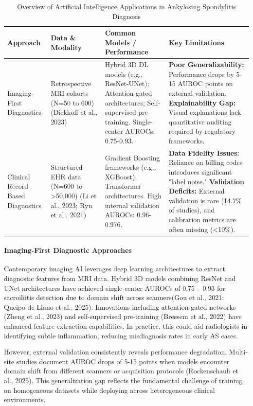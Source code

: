 \documentclass[12pt, a4paper]{article}
\begin{document}
\begin{table}[H]
\centering
\normalsize
\caption{Overview of Artificial Intelligence Applications in Ankylosing Spondylitis Diagnosis}
\label{tab:ai_applications}
\begin{tabularx}{\textwidth}{p{2cm} p{2.5cm} p{3.5cm} X}
\toprule
\textbf{Approach} & \textbf{Data \& Modality} & \textbf{Common Models / Performance} & \textbf{Key Limitations} \\
\midrule
Imaging-First Diagnostics & Retrospective MRI cohorts (N=50 to 600) (Diekhoff et al., 2023) & Hybrid 3D DL models (e.g., ResNet-UNet); Attention-gated architectures; Self-supervised pre-training. Single-center AUROCs: 0.75-0.93. & \textbf{Poor Generalizability:} Performance drops by 5-15 AUROC points on external validation. \textbf{Explainability Gap:} Visual explanations lack quantitative auditing required by regulatory frameworks. \\
\addlinespace
Clinical Record-Based Diagnostics & Structured EHR data (N=600 to >50,000) (Li et al., 2023; Ryu et al., 2021) & Gradient Boosting frameworks (e.g., XGBoost); Transformer architectures. High internal validation AUROCs: 0.96-0.976. & \textbf{Data Fidelity Issues:} Reliance on billing codes introduces significant "label noise." \textbf{Validation Deficits:} External validation is rare (14.7\% of studies), and calibration metrics are often missing (<10\%). \\
\bottomrule
\end{tabularx}
\end{table}




\paragraph{Imaging-First Diagnostic Approaches}
Contemporary imaging AI leverages deep learning architectures to extract diagnostic features from MRI data. Hybrid 3D models combining ResNet and UNet architectures have achieved single-center AUROCs of 0.75 -- 0.93 for sacroiliitis detection due to domain shift across scanners(Gou et al., 2021; Queipo-de-Llano et al., 2025). Innovations including attention-gated networks (Zheng et al., 2023) and self-supervised pre-training (Bressem et al., 2022) have enhanced feature extraction capabilities. In practice, this could aid radiologists in identifying subtle inflammation, reducing misdiagnosis rates in early AS cases.

However, external validation consistently reveals performance degradation. Multi-site studies document AUROC drops of 5-15 points when models encounter domain shift from different scanners or acquisition protocols (Rockenschaub et al., 2025). This generalization gap reflects the fundamental challenge of training on homogeneous datasets while deploying across heterogeneous clinical environments.
\end{document}
